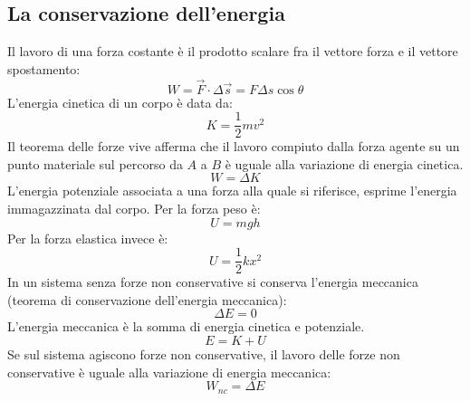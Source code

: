 \documentclass{article}
\begin{document}
\subsection{La conservazione dell'energia}
Il lavoro di una forza costante è il prodotto scalare fra il vettore forza e il vettore spostamento:
\begin{equation}
    W=\vec{F}\cdot\Delta\vec{s}=F\Delta s \cos{\theta}
\end{equation}
L'energia cinetica di un corpo è data da:
\begin{equation}
    K=\frac{1}{2}mv^2    
\end{equation}
Il teorema delle forze vive afferma che il lavoro compiuto dalla forza agente su un punto materiale sul percorso da $A$ a $B$ è uguale alla variazione di energia cinetica.
\begin{equation}
    W=\Delta K
\end{equation}
L'energia potenziale associata a una forza alla quale si riferisce, esprime l'energia immagazzinata dal corpo. Per la forza peso è:
\begin{equation}
    U=mgh
\end{equation}
Per la forza elastica invece è:
\begin{equation}
    U=\frac{1}{2}kx^2
\end{equation}
In un sistema senza forze non conservative si conserva l'energia meccanica (teorema di conservazione dell'energia meccanica):
\begin{equation}
    \Delta E=0
\end{equation}
L'energia meccanica è la somma di energia cinetica e potenziale.
\begin{equation}
    E=K+U
\end{equation}
Se sul sistema agiscono forze non conservative, il lavoro delle forze non conservative è uguale alla variazione di energia meccanica:
\begin{equation}
    W_{nc}=\Delta E
\end{equation}
\end{document}
